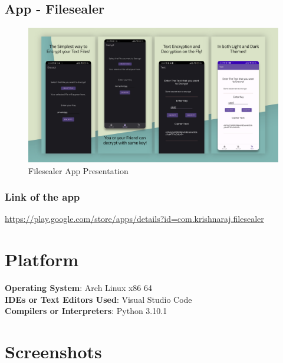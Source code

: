 \documentclass[11pt]{article}
\begin{document}
\subsection{App - Filesealer}

\begin{figure}[H]
    \centering
    \includegraphics[width=.95\textwidth]{screenshots/presentation.png}
    \caption{Filesealer App Presentation}
\end{figure}

\subsubsection*{Link of the app}
\url{https://play.google.com/store/apps/details?id=com.krishnaraj.filesealer}

\section{Platform}
\textbf{Operating System}: Arch Linux x86 64 \\
\textbf{IDEs or Text Editors Used}: Visual Studio Code\\
\textbf{Compilers or Interpreters}: Python 3.10.1\\

\section{Screenshots}
\end{document}
